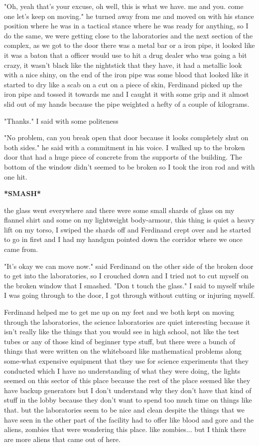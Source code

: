 \documentclass[14pt,letterpaper]{book}
\begin{document}
"Oh, yeah that's your excuse, oh well, this is what we have. me and you. come one let's keep on moving." he turned away from me and moved on with his stance position where he was in a tactical stance where he was ready for anything, so I do the same, we were getting close to the laboratories and the next section of the complex, as we got to the door there was a metal bar or a iron pipe, it looked like it was a baton that a officer would use to hit a drug dealer who was going a bit crazy, it wasn't black like the nightstick that they have, it had a metallic look with a nice shiny, on the end of the iron pipe was some blood that looked like it started to dry like a scab on a cut on a piece of skin, Ferdinand picked up the iron pipe and tossed it towards me and I caught it with some grip and it almost slid out of my hands because the pipe weighted a hefty of a couple of kilograms.


"Thanks." I said with some politeness


"No problem, can you break open that door because it looks completely shut on both sides." he said with a commitment in his voice.
I walked up to the broken door that had a huge piece of concrete from the supports of the building.
The bottom of the window didn't seemed to be broken so I took the iron rod and with one hit.

\textbf{*SMASH*}

the glass went everywhere and there were some small shards of glass on my flannel shirt and some on my lightweight body-armour, this thing is quiet a heavy lift on my torso, I swiped the shards off and Ferdinand crept over and he started to go in first and I had my handgun pointed down the corridor where we once came from.

"It's okay we can move now." said Ferdinand on the other side of the broken door to get into the laboratories, so I crouched down and I tried not to cut myself on the broken window that I smashed. "Don t touch the glass." I said to myself while I was going through to the door, I got through without cutting or injuring myself.

Ferdinand helped me to get me up on my feet and we both kept on moving through the laboratories, the science laboratories are quiet interesting because it isn't really like the things that you would see in high school, not like the test tubes or any of those kind of beginner type stuff, but there were a bunch of things that were written on the whiteboard like mathematical problems along some-what expensive equipment that they use for science experiments that they conducted which I have no understanding of what they were doing, the lights seemed on this sector of this place because the rest of the place seemed like they have backup generators but I don't understand why they don't have that kind of stuff in the lobby because they don't want to spend too much time on things like that. but the laboratories seem to be nice and clean despite the things that we have seen in the other part of the facility had to offer like blood and gore and the aliens, zombies that were wondering this place. like zombies... but I think there are more aliens that came out of here.
\end{document}
